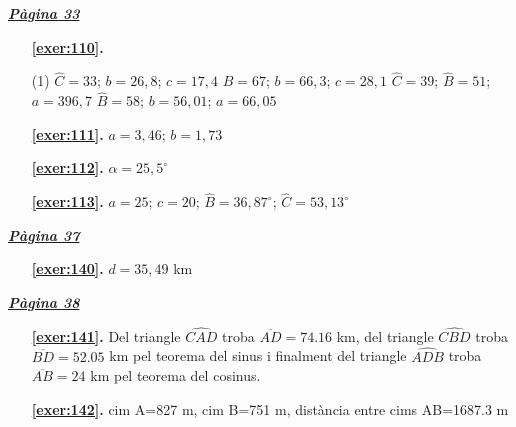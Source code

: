 \hyperlink{page.33}{\textbf{\em Pàgina 33}}
\begin{enumerate}



 \item[\fontfamily{phv}\selectfont\color{blue}\textbf{\ref{exer:110}. }] \label{ans:110}
 \begin{tasks}[column-sep=1em, item-indent=1.3333em](1)
	 \task* $\hat C=33$; $b=26,8$; $c=17,4$
	 \task* $\hat B=67$; $b=66,3$; $c=28,1$
	 \task* $\hat C=39$; $\hat B=51$; $a=396,7$
	 \task* $\hat B=58$; $b=56,01$; $a=66,05$
\end{tasks}
 \end{enumerate}
\begin{enumerate}
\item[\fontfamily{phv}\selectfont\color{blue}\textbf{\ref{exer:111}. }] \label{ans:111} 
$a=3,46$; $b=1,73$
\item[\fontfamily{phv}\selectfont\color{blue}\textbf{\ref{exer:112}. }] \label{ans:112} 
$\alpha =25,5^\circ $
\item[\fontfamily{phv}\selectfont\color{blue}\textbf{\ref{exer:113}. }] \label{ans:113} 
 $a=25$; $c=20$; $\hat B=36,87^\circ $; $\hat C=53,13^\circ $
 \end{enumerate}
\vspace{0.3cm}


\hyperlink{page.37}{\textbf{\em Pàgina 37}}
\begin{enumerate}
\item[\fontfamily{phv}\selectfont\color{blue}\textbf{\ref{exer:140}. }] \label{ans:140} 
$d=35,49$ km
 \end{enumerate}
\vspace{0.3cm}


\hyperlink{page.38}{\textbf{\em Pàgina 38}}
\begin{enumerate}
\item[\fontfamily{phv}\selectfont\color{blue}\textbf{\ref{exer:141}. }] \label{ans:141} 
Del triangle $\widehat {CAD}$ troba $\overline {AD}=74.16$ km, del triangle $\widehat {CBD}$ troba $\overline {BD}=52.05$ km pel teorema del sinus i finalment del triangle $\widehat {ADB}$ troba $\overline {AB}=24$ km pel teorema del cosinus.
 \end{enumerate}
\begin{enumerate}
\item[\fontfamily{phv}\selectfont\color{blue}\textbf{\ref{exer:142}. }] \label{ans:142} 
cim A=827 m, cim B=751 m, distància entre cims AB=1687.3 m
 \end{enumerate}
\vspace{0.3cm}

